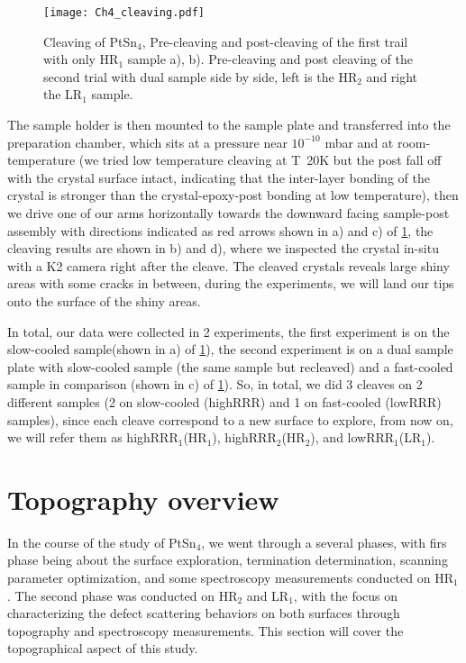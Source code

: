 \begin{figure}
	\centering
	\texttt{[image: Ch4\_cleaving.pdf]}
	\caption{Cleaving of PtSn$_4$, Pre-cleaving and post-cleaving of the first trail with only HR$_1$ sample a), b). Pre-cleaving and post cleaving of the second trial with dual sample side by side, left is the HR$_2$ and right the LR$_1$ sample. }
	\label{fig:ch4_cleaves}
\end{figure}

\par The sample holder is then mounted to the sample plate and transferred into the preparation chamber, which sits at a pressure near $10^{-10}$ mbar and at room-temperature (we tried low temperature cleaving at T~20K but the post fall off with the crystal surface intact, indicating that the inter-layer bonding of the crystal is stronger than the crystal-epoxy-post bonding at low temperature), then we drive one of our arms horizontally towards the downward facing sample-post assembly with directions indicated as red arrows shown in a) and c) of \ref{fig:ch4_cleaves}, the cleaving results are shown in b) and d), where we inspected the crystal in-situ with a K2 camera right after the cleave. The cleaved crystals reveals large shiny areas with some cracks in between, during the experiments, we will land our tips onto the surface of the shiny areas. 

\par In total, our data were collected in 2 experiments, the first experiment is on the slow-cooled sample(shown in a) of \ref{fig:ch4_cleaves}), the second experiment is on a dual sample plate with slow-cooled sample (the same sample but recleaved) and a fast-cooled sample in comparison (shown in c) of \ref{fig:ch4_cleaves}). So, in total, we did 3 cleaves on 2 different samples (2 on slow-cooled  (highRRR) and 1 on fast-cooled (lowRRR) samples), since each cleave correspond to a new surface to explore, from now on, we will refer them as highRRR$_1$(HR$_1$), highRRR$_2$(HR$_2$), and lowRRR$_1$(LR$_1$).


\section{Topography overview}
\par In the course of the study of PtSn$_4$, we went through a several phases, with firs phase being about the surface exploration, termination determination, scanning parameter optimization, and some spectroscopy measurements conducted on HR$_1$. The second phase was conducted on HR$_2$ and LR$_1$, with the focus on characterizing the defect scattering behaviors on both surfaces through topography and spectroscopy measurements. This section will cover the topographical aspect of this study. 

